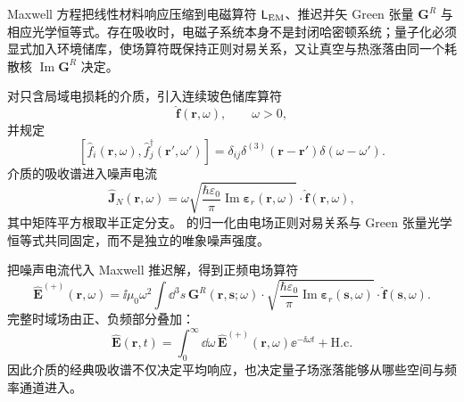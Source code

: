 
Maxwell 方程把线性材料响应压缩到电磁算符 \(\mathsf L_{\rm EM}\)、推迟并矢 Green 张量 \(\mathbf G^R\) 与相应光学恒等式。存在吸收时，电磁子系统本身不是封闭哈密顿系统；量子化必须显式加入环境储库，使场算符既保持正则对易关系，又让真空与热涨落由同一个耗散核 \(\operatorname{Im}\mathbf G^R\) 决定。

对只含局域电损耗的介质，引入连续玻色储库算符
\begin{equation*}
 \hat{\mathbf f}(\mathbf r,\omega),
 \qquad \omega>0,
\end{equation*}
并规定
\begin{equation}
 \boxed{
 [\hat f_i(\mathbf r,\omega),
 \hat f_j^\dagger(\mathbf r',\omega')]
 =\delta_{ij}\delta^{(3)}(\mathbf r-\mathbf r')\delta(\omega-\omega').}
 \label{eq:reservoir-comm-SI-r12}
\end{equation}
介质的吸收谱进入噪声电流
\begin{equation}
 \boxed{
 \hat{\mathbf J}_{N}(\mathbf r,\omega)
 =\omega
 \sqrt{\frac{\hbar\varepsilon_0}{\pi}
 \operatorname{Im}\boldsymbol\varepsilon_r(\mathbf r,\omega)}
 \cdot\hat{\mathbf f}(\mathbf r,\omega),}
 \label{eq:noise-current-SI-r12}
\end{equation}
其中矩阵平方根取半正定分支。 的归一化由电场正则对易关系与 Green 张量光学恒等式共同固定，而不是独立的唯象噪声强度。


把噪声电流代入 Maxwell 推迟解，得到正频电场算符
\begin{equation}
 \boxed{
 \hat{\mathbf E}^{(+)}(\mathbf r,\omega)
 =\ii\mu_0\omega^2
 \int\dd^3 s\,
 \mathbf G^R(\mathbf r,\mathbf s;\omega)
 \cdot
 \sqrt{\frac{\hbar\varepsilon_0}{\pi}
 \operatorname{Im}\boldsymbol\varepsilon_r(\mathbf s,\omega)}
 \cdot\hat{\mathbf f}(\mathbf s,\omega).}
 \label{eq:macqed-Eplus-SI-r12}
\end{equation}
完整时域场由正、负频部分叠加：
\begin{equation*}
 \hat{\mathbf E}(\mathbf r,t)
 =\int_0^\infty\dd\omega\,
 \hat{\mathbf E}^{(+)}(\mathbf r,\omega)\ee^{-\ii\omega t}
 +\mathrm{H.c.}
\end{equation*}
因此介质的经典吸收谱不仅决定平均响应，也决定量子场涨落能够从哪些空间与频率通道进入。

